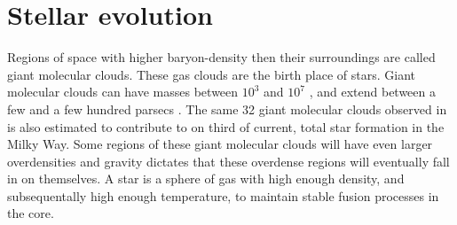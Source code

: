 \section{Stellar evolution}




\begin{figure}
  
\end{figure}

Regions of space with higher baryon-density then their surroundings are called giant molecular clouds.
These gas clouds are the birth place of stars.
Giant molecular clouds can have masses between $10^3$ and $10^7$ \msol, and extend between a few and a few hundred parsecs .
The same 32 giant molecular clouds observed in  is also estimated to contribute to on third of current, total star formation in the Milky Way.
Some regions of these giant molecular clouds will have even larger overdensities and gravity dictates that these overdense regions will eventually fall in on themselves.
A star is a sphere of gas with high enough density, and subsequentally high enough temperature, to maintain stable fusion processes in the core.

